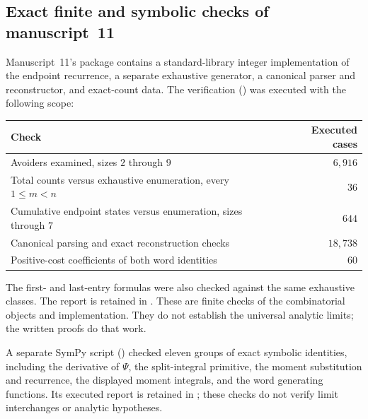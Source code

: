 \documentclass[11pt,a4paper]{article}
\theoremstyle{definition}\newaliascnt{definition}{theorem}
\theoremstyle{remark}\newaliascnt{remark}{theorem}
\begin{document}
\subsection{Exact finite and symbolic checks of manuscript~11}
Manuscript~11's package contains a standard-library integer implementation of
the endpoint recurrence, a separate exhaustive generator, a canonical parser
and reconstructor, and exact-count data. The verification
() was executed with the
following scope:
\begin{center}
\begin{tabular}{lr}
\toprule
Check & Executed cases\\
\midrule
Avoiders examined, sizes $2$ through $9$ & $6{,}916$\\
Total counts versus exhaustive enumeration, every $1\le m<n$ & $36$\\
Cumulative endpoint states versus enumeration, sizes through $7$ & $644$\\
Canonical parsing and exact reconstruction checks & $18{,}738$\\
Positive-cost coefficients of both word identities & $60$\\
\bottomrule
\end{tabular}
\end{center}
The first- and last-entry formulas were also checked against the same
exhaustive classes. The report is retained in
. These are finite checks
of the combinatorial objects and implementation. They do not establish the
universal analytic limits; the written proofs do that work.

A separate SymPy script ()
checked eleven groups of exact symbolic identities, including the derivative
of $\Psi$, the split-integral primitive, the moment substitution and
recurrence, the displayed moment integrals, and the word generating
functions. Its executed report is retained in
; these checks
do not verify limit interchanges or analytic hypotheses.
\end{document}
